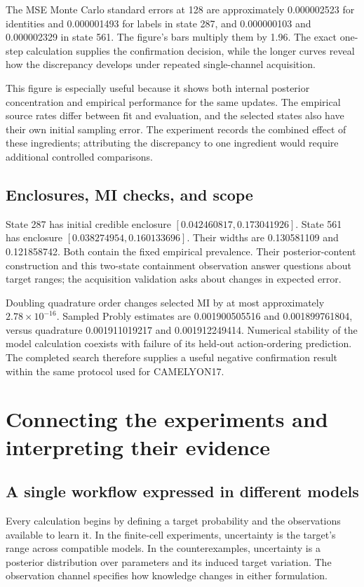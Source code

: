 \documentclass[11pt,a4paper]{report}
\begin{document}
The MSE Monte Carlo standard errors at 128 are approximately 0.000002523 for identities and 0.000001493 for labels in state 287, and 0.000000103 and 0.000002329 in state 561. The figure's bars multiply them by 1.96. The exact one-step calculation supplies the confirmation decision, while the longer curves reveal how the discrepancy develops under repeated single-channel acquisition.

This figure is especially useful because it shows both internal posterior concentration and empirical performance for the same updates. The empirical source rates differ between fit and evaluation, and the selected states also have their own initial sampling error. The experiment records the combined effect of these ingredients; attributing the discrepancy to one ingredient would require additional controlled comparisons.

\section{Enclosures, MI checks, and scope}
State 287 has initial credible enclosure $[0.042460817,0.173041926]$. State 561 has enclosure $[0.038274954,0.160133696]$. Their widths are 0.130581109 and 0.121858742. Both contain the fixed empirical prevalence. Their posterior-content construction and this two-state containment observation answer questions about target ranges; the acquisition validation asks about changes in expected error.

Doubling quadrature order changes selected MI by at most approximately $2.78\times10^{-16}$. Sampled Probly estimates are 0.001900505516 and 0.001899761804, versus quadrature 0.001911019217 and 0.001912249414. Numerical stability of the model calculation coexists with failure of its held-out action-ordering prediction. The completed search therefore supplies a useful negative confirmation result within the same protocol used for CAMELYON17.

\chapter{Connecting the experiments and interpreting their evidence}
\section{A single workflow expressed in different models}
Every calculation begins by defining a target probability and the observations available to learn it. In the finite-cell experiments, uncertainty is the target's range across compatible models. In the counterexamples, uncertainty is a posterior distribution over parameters and its induced target variation. The observation channel specifies how knowledge changes in either formulation.
\end{document}
